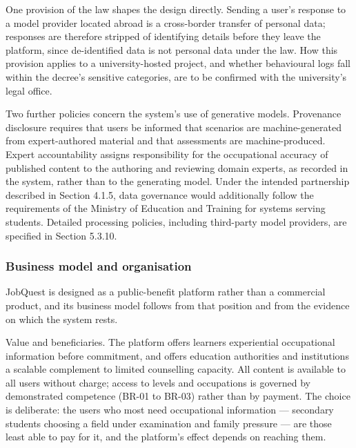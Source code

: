 One provision of the law shapes the design directly. Sending a user's response to a model provider located abroad is a cross-\allowbreak{}border transfer of personal data; responses are therefore stripped of identifying details before they leave the platform, since de-\allowbreak{}identified data is not personal data under the law. How this provision applies to a university-\allowbreak{}hosted project, and whether behavioural logs fall within the decree's sensitive categories, are to be confirmed with the university's legal office.

Two further policies concern the system's use of generative models. Provenance disclosure requires that users be informed that scenarios are machine-\allowbreak{}generated from expert-\allowbreak{}authored material and that assessments are machine-\allowbreak{}produced. Expert accountability assigns responsibility for the occupational accuracy of published content to the authoring and reviewing domain experts, as recorded in the system, rather than to the generating model. Under the intended partnership described in Section 4.1.5, data governance would additionally follow the requirements of the Ministry of Education and Training for systems serving students. Detailed processing policies, including third-party model providers, are specified in Section 5.3.10.

\subsubsection{Business model and organisation}

JobQuest is designed as a public-\allowbreak{}benefit platform rather than a commercial product, and its business model follows from that position and from the evidence on which the system rests.

Value and beneficiaries. The platform offers learners experiential occupational information before commitment, and offers education authorities and institutions a scalable complement to limited counselling capacity. All content is available to all users without charge; access to levels and occupations is governed by demonstrated competence (BR-01 to BR-03) rather than by payment. The choice is deliberate: the users who most need occupational information --- secondary students choosing a field under examination and family pressure --- are those least able to pay for it, and the platform's effect depends on reaching them.

